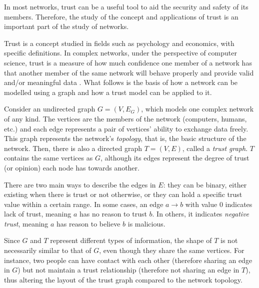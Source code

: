 
In most networks, trust can be a useful tool to aid the security and safety of its members.
Therefore, the study of the concept and applications of trust is an important part of the study of networks. 

Trust is a concept studied in fields such as psychology and economics, with specific definitions.
In complex networks, under the perspective of computer science, trust is a measure of how much confidence one member of a network has that another member of the same network will behave properly and provide valid and/or meaningful data \citep{sherchan2013survey}.
What follows is the basis of how a network can be modelled using a graph and how a trust model can be applied to it.

Consider an undirected graph $G = (V, E_G)$, which models one complex network of any kind.
The vertices are the members of the network (computers, humans, etc.) and each edge represents a pair of vertices' ability to exchange data freely.
This graph represents the network's \textit{topology}, that is, the basic structure of the network.
Then, there is also a directed graph $T = (V, E)$, called a \textit{trust graph}.
$T$ contains the same vertices as $G$, although its edges represent the degree of trust (or opinion) each node has towards another.

There are two main ways to describe the edges in $E$: they can be binary, either existing when there is trust or not otherwise, or they can hold a specific trust value within a certain range.
In some cases, an edge $a\rightarrow b$ with value 0 indicates lack of trust, meaning $a$ has no reason to trust $b$.
In others, it indicates \textit{negative trust}, meaning $a$ has reason to believe $b$ is malicious.

Since $G$ and $T$ represent different types of information, the shape of $T$ is not necessarily similar to that of $G$, even though they share the same vertices.
For instance, two people can have contact with each other (therefore sharing an edge in $G$) but not maintain a trust relationship (therefore not sharing an edge in $T$), thus altering the layout of the trust graph compared to the network topology.

